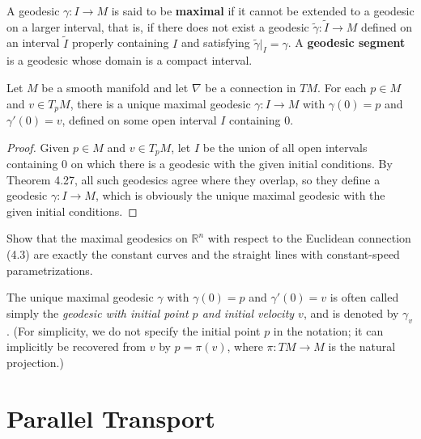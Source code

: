 A geodesic $\gamma: I \to M$ is said to be \textbf{maximal} if it cannot be extended to a geodesic on a larger interval, that is, if there does not exist a geodesic $\tilde{\gamma}: \tilde{I} \to M$ defined on an interval $\tilde{I}$ properly containing $I$ and satisfying $\tilde{\gamma}|_I = \gamma$. A \textbf{geodesic segment} is a geodesic whose domain is a compact interval.


\begin{corollary}
\label{cor:existence-of-maximal-geodesic}
Let $M$ be a smooth manifold and let $\nabla$ be a connection in $TM$. For each $p \in M$ and $v \in T_p M$, there is a unique maximal geodesic $\gamma : I \to M$ with $\gamma(0) = p$ and $\gamma'(0) = v$, defined on some open interval $I$ containing $0$.
\end{corollary}

\begin{proof}
Given $p \in M$ and $v \in T_p M$, let $I$ be the union of all open intervals containing $0$ on which there is a geodesic with the given initial conditions. By Theorem 4.27, all such geodesics agree where they overlap, so they define a geodesic $\gamma : I \to M$, which is obviously the unique maximal geodesic with the given initial conditions.
\end{proof}

\begin{exercise}
\label{exer:euclidean-geodesics}
Show that the maximal geodesics on $\mathbb{R}^n$ with respect to the Euclidean connection (4.3) are exactly the constant curves and the straight lines with constant-speed parametrizations.
\end{exercise}

The unique maximal geodesic $\gamma$ with $\gamma(0) = p$ and $\gamma'(0) = v$ is often called simply the \emph{geodesic with initial point $p$ and initial velocity $v$}, and is denoted by $\gamma_v$. (For simplicity, we do not specify the initial point $p$ in the notation; it can implicitly be recovered from $v$ by $p = \pi(v)$, where $\pi : TM \to M$ is the natural projection.)

\section{Parallel Transport}

